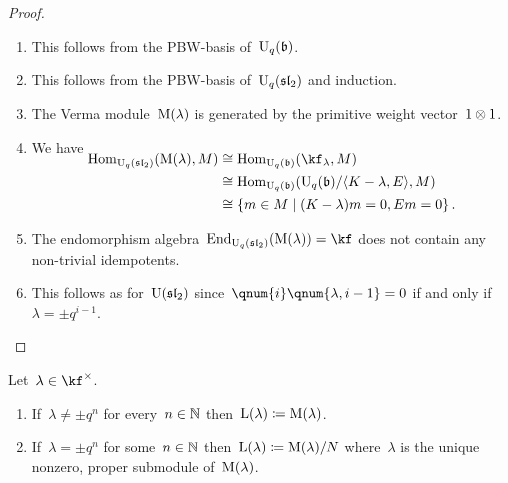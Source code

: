 \documentclass[a4paper, 11pt, oneside]{scrartcl}
\begin{document}
\begin{proof}
  \leavevmode
  \begin{enumerate}
    \item
      This follows from the PBW-basis of~$\operatorname{U}_q(\mathfrak{b})$.
    \item
      This follows from the PBW-basis of~$\operatorname{U}_q(\mathfrak{sl}_2)$ and induction.
    \item
      The Verma module~$\operatorname{M}(\lambda)$ is generated by the primitive weight vector~$1 \otimes 1$.
    \item
      We have
      \begin{align*}
        \SwapAboveDisplaySkip
        \Hom_{\Univ_q(\sllie_2)}( \verma(\lambda), M )
        &\cong
        \Hom_{\Univ_q(\blie)}( \kf_\lambda, M )
        \\
        &\cong
        \Hom_{\Univ_q(\blie)}( \Univ_q(\blie) / \gen{K - \lambda, E}, M)
        \\
        &\cong
        \{
          m \in M
        \suchthat
          (K - \lambda) m = 0,
          E m = 0
        \} \,.
      \end{align*}
    \item
      The endomorphism algebra~$\End_{\Univ_q(\sllie_2)}( \verma(\lambda) ) = \kf$ does not contain any non-trivial idempotents.
    \item
      This follows as for~$\operatorname{U}(\mathfrak{sl}_2)$ since~$\qnum{i} \qnum{\lambda, i-1} = 0$ if and only if~$\lambda = \pm q^{i-1}$.
    \qedhere
  \end{enumerate}
\end{proof}

\begin{definition}
  Let~$\lambda \in \kf^\times$.
  \begin{enumerate}
    \item
      If~$\lambda \neq \pm q^n$ for every~$n \in \mathbb{N}$ then~$\operatorname{L}(\lambda) \coloneqq \operatorname{M}(\lambda)$.
    \item
      If~$\lambda = \pm q^n$ for some~$n \in \mathbb{N}$ then~$\operatorname{L}(\lambda) \coloneqq \operatorname{M}(\lambda)/N$ where~$\lambda$ is the unique nonzero, proper submodule of~$\operatorname{M}(\lambda)$.
  \end{enumerate}
\end{definition}
\end{document}
